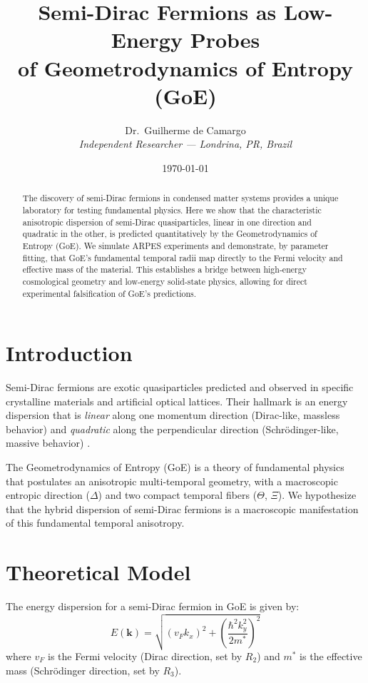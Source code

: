 \documentclass[12pt]{article}
\title{\textbf{Semi-Dirac Fermions as Low-Energy Probes\\
of Geometrodynamics of Entropy (GoE)}}
\author{Dr.\ Guilherme de Camargo\\
\emph{Independent Researcher — Londrina, PR, Brazil}}
\date{\today}
\begin{document}
\maketitle

\begin{abstract}
\noindent
The discovery of semi-Dirac fermions in condensed matter systems provides a unique laboratory for testing fundamental physics. Here we show that the characteristic anisotropic dispersion of semi-Dirac quasiparticles, linear in one direction and quadratic in the other, is predicted quantitatively by the Geometrodynamics of Entropy (GoE). We simulate ARPES experiments and demonstrate, by parameter fitting, that GoE's fundamental temporal radii map directly to the Fermi velocity and effective mass of the material. This establishes a bridge between high-energy cosmological geometry and low-energy solid-state physics, allowing for direct experimental falsification of GoE's predictions.
\end{abstract}

\section{Introduction}

Semi-Dirac fermions are exotic quasiparticles predicted and observed in specific crystalline materials and artificial optical lattices. Their hallmark is an energy dispersion that is \textit{linear} along one momentum direction (Dirac-like, massless behavior) and \textit{quadratic} along the perpendicular direction (Schrödinger-like, massive behavior) \cite{Banerjee2009}.

The Geometrodynamics of Entropy (GoE) is a theory of fundamental physics that postulates an anisotropic multi-temporal geometry, with a macroscopic entropic direction ($\Delta$) and two compact temporal fibers ($\Theta$, $\Xi$). We hypothesize that the hybrid dispersion of semi-Dirac fermions is a macroscopic manifestation of this fundamental temporal anisotropy.

\section{Theoretical Model}

The energy dispersion for a semi-Dirac fermion in GoE is given by:
\begin{equation}
    E(\mathbf{k}) = \sqrt{(v_F k_x)^2 + \left( \frac{\hbar^2 k_y^2}{2m^*} \right)^2 }
\end{equation}
where $v_F$ is the Fermi velocity (Dirac direction, set by $R_2$) and $m^*$ is the effective mass (Schrödinger direction, set by $R_3$).
\end{document}
